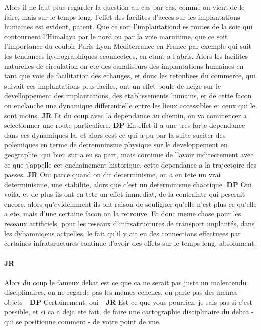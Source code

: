 \documentclass[12pt]{article}
\begin{document}
Alors il ne faut plus regarder la question au cas par cas, comme on vient de le faire, mais sur le temps long, l'effet des facilites d'acces sur les implantations humaines est evident, patent. Que ce soit l'implantationd es routes de la soie qui contournent l'Himalaya par le nord ou par la voie maruitime, que ce soit l'importance du couloir Paris Lyon Mediterranee en France par exemple qui suit les tendances hydrographiques cconnectees, en etant a l'abris. Alors les facilites naturelles de circulation on ete des canaliseurs des implantations humaines en tant que voie de facilitation des echanges, et donc les retonbees du commerce, qui suivait ces implantations plus faciles, ont un effet boule de neige sur le develloppement des implantations, des etablissements humains, et de cette facon on enclanche une dynamique differentielle entre les lieux accessibles et ceux qui le sont moins. \textbf{JR} Et du coup avec la dependance au chemin, on va commencer a selectionner une route particuliere. \textbf{DP} En effet il a une tres forte dependance dans ces dynamiques la, et alors cest ce qui a pu par la suite suciter des polemiques en terme de detremninsme physique sur le developpement en geographie, qui bien sur a eu sa part, mais continue de l'avoir indirectement avec ce que j'appelle cet enchainement historique, cette dependance a la trajectoire des passes. \textbf{JR} Oui parce quand on dit determinisme, on a en tete un vrai determinisime, une stabilite, alors que c'est un determinisme chaotique. \textbf{DP} Oui voila, et de plus ils ont en tete un effet immediat, de la contrainte qui peserait encore, alors qu'evidemment ils ont raison de souligner qu'elle n'est plus ce qu'elle a ete, mais d'une certaine facon on la retrouve. Et donc meme chose pour les reseaux artificiels, pour les reseaux d'infrsatructures de transport implantés, dans les dybamniqeus actuelles, le fait qu'il y ait eu des connections effectuees par certaines infratsructures continue d'avoir des effets sur le temps long, absolument.

\paragraph{JR}

Alors du coup le fameux debat est ce que ca ne serait pas juste un malentendu disciplinaires, on ne regarde pas les memes echelles, on parle pas des memes objets - \textbf{DP} Certainement. oui - \textbf{JR} Est ce que vous pourriez, je sais pas si c'est possible, et si ca a deja ete fait, de faire une cartographie disciplinaire du debat - qui se positionne comment - de votre point de vue.
\end{document}
